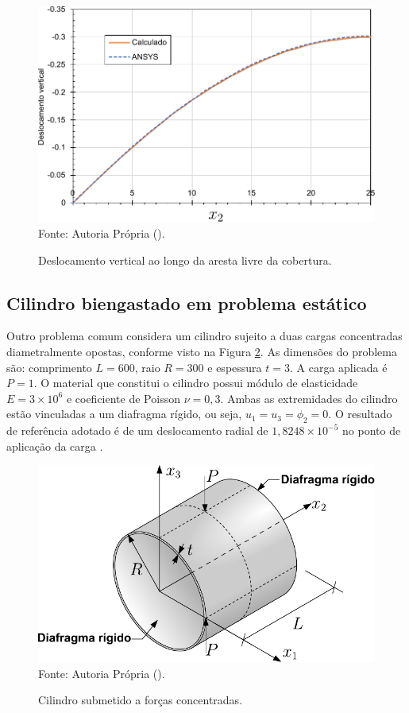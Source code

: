 \begin{figure}[h!]
    \centering
    \caption{Deslocamento vertical ao longo da aresta livre da cobertura.}
    \includegraphics[width=0.6\linewidth]{Figuras/scordelis/deslocamento.pdf}
    \\Fonte: Autoria Própria (\the\year).
    \label{fig:scordelis-graph}
\end{figure}

\subsection{Cilindro biengastado em problema estático} \label{Ap:Shell-cyl}

Outro problema comum considera um cilindro sujeito a duas cargas concentradas diametralmente opostas, conforme visto na Figura \ref{fig:cylinder-shell}. As dimensões do problema são: comprimento $L=600$, raio $R=300$ e espessura $t=3$. A carga aplicada é $P=1$. O material que constitui o cilindro possui módulo de elasticidade $E=3\times10^6$ e coeficiente de Poisson $\nu=0,3$. Ambas as extremidades do cilindro estão vinculadas a um diafragma rígido, ou seja, $u_1=u_3=\phi_2=0$. O resultado de referência adotado é de um deslocamento radial de $1,8248\times10^{-5}$ no ponto de aplicação da carga \cite{BELYTSCHKO1985221,CHAUDINH2023110222,ZHOU2022108568}.

\begin{figure}[h!]
    \centering
    \caption{Cilindro submetido a forças concentradas.}
    \includegraphics[width=0.65\linewidth]{Figuras/cylinder-shell/cylinder.pdf}
    \\Fonte: Autoria Própria (\the\year).
    \label{fig:cylinder-shell}
\end{figure}


